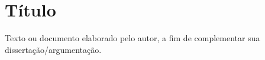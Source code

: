 \chapter{Título}\label{apendice1}

Texto ou documento elaborado pelo autor, a fim de complementar sua dissertação/argumentação.